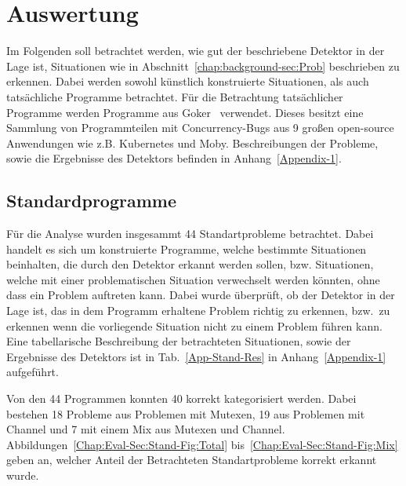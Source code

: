 \chapter{Auswertung}\label{Chap:Eval}
Im Folgenden soll betrachtet werden, wie gut der beschriebene Detektor 
in der Lage ist, Situationen wie in Abschnitt~\ref{chap:background-sec:Prob}
beschrieben zu erkennen. Dabei werden sowohl künstlich konstruierte 
Situationen, als auch tatsächliche Programme betrachtet. Für die Betrachtung 
tatsächlicher Programme werden Programme aus Goker~\cite{gobench}
verwendet. Dieses besitzt eine Sammlung von Programmteilen mit 
Concurrency-Bugs aus 9 
großen open-source Anwendungen wie z.B. Kubernetes und Moby. 
Beschreibungen der Probleme, sowie die Ergebnisse des Detektors befinden in 
Anhang~\ref{Appendix-1}.

\section{Standardprogramme}
Für die Analyse wurden insgesammt 44 Standartprobleme betrachtet. 
Dabei handelt es sich um konstruierte Programme, welche bestimmte 
Situationen beinhalten, die durch den Detektor erkannt werden sollen, 
bzw. Situationen, welche mit einer problematischen Situation verwechselt 
werden könnten, ohne dass ein Problem auftreten kann.  
Dabei wurde überprüft, ob der Detektor in der Lage ist, das in dem 
Programm erhaltene Problem richtig zu erkennen, bzw.~zu erkennen wenn 
die vorliegende Situation nicht zu einem Problem führen kann. Eine 
tabellarische Beschreibung der betrachteten Situationen, sowie der Ergebnisse 
des Detektors ist in Tab.~\ref{App-Stand-Res} in Anhang~\ref{Appendix-1} aufgeführt.

Von den 44 Programmen konnten 40 korrekt kategorisiert werden. Dabei 
bestehen 18 Probleme aus Problemen mit Mutexen,
19 aus Problemen mit Channel und 7 mit einem 
Mix aus Mutexen und Channel. Abbildungen~\ref{Chap:Eval-Sec:Stand-Fig:Total}
bis~\ref{Chap:Eval-Sec:Stand-Fig:Mix} geben an, welcher Anteil der 
Betrachteten Standartprobleme korrekt erkannt wurde.

